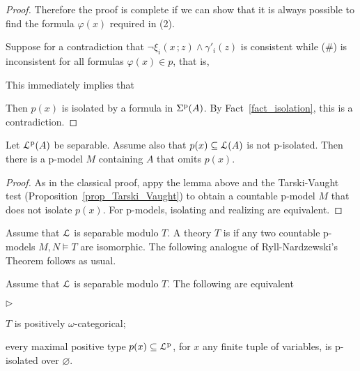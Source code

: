 \documentclass[10pt,oneside]{amsproc}
\newcommand{\mylabel}[1]{{#1}\hfill}
\renewenvironment{itemize}
  {\begin{list}{$\triangleright$}{%
  \setlength{\parskip}{0mm}
  \setlength{\topsep}{.4\baselineskip}
  \setlength{\rightmargin}{0mm}
  \setlength{\listparindent}{0mm}
  \setlength{\itemindent}{0mm}
  \setlength{\labelwidth}{3ex}
  \setlength{\itemsep}{.2\baselineskip}
  \setlength{\parsep}{.2\baselineskip}
  \setlength{\partopsep}{0mm}
  \setlength{\labelsep}{1ex}
  \setlength{\leftmargin}{\labelwidth+\labelsep}
  \let\makelabel\mylabel}}{%
\end{list}}
\renewcommand*{\emph}[1]{%
   \smash{\tikz[baseline]\node[rectangle, fill=teal!25, rounded corners, inner xsep=0.5ex, inner ysep=0.2ex, anchor=base, minimum height = 2.7ex]{\strut #1};}}
\begin{document}
{\begin{proof}
  Therefore the proof is complete if we can show that it is always possible to find the formula $\varphi(x)$ required in (2).
  
  Suppose for a contradiction that $\neg\xi_i(x\,;z)\wedge\gamma'_i(z)$ is consistent while (\#) is inconsistent for all formulas $\varphi(x)\in p$, that is, 
  
  
  This immediately implies that 
  
  
  Then $p(x)$ is isolated by a formula in $\Sigma^{\rm p}(A)$.
  By Fact~\ref{fact_isolation}, this is a contradiction.
  \end{proof}
  

\begin{theorem}\label{prop_OTT}
  Let ${\EuScript L}^{\rm p}(A)$ be separable.
  Assume also that $p(x)\subseteq{\EuScript L}(A)$ is not p-isolated.
  Then there is a p-model $M$ containing $A$ that omits $p(x)$. 
\end{theorem}

\begin{proof}
  As in the classical proof, appy the lemma above and the Tarski-Vaught test (Proposition~\ref{prop_Tarski_Vaught}) to obtain a countable p-model $M$ that does not isolate $p(x)$.
  For p-models, isolating and realizing are equivalent.
\end{proof}

Assume that ${\EuScript L}$ is separable modulo $T$.
A theory $T$ is \emph{positively $\omega$-categorical\/} if any two countable p-models $M,N\models T$ are isomorphic.
The following analogue of Ryll-Nardzewski's Theorem follows as usual.

\begin{theorem}
  Assume that ${\EuScript L}$ is separable modulo $T$.
  The following are equivalent
  \begin{itemize}
    \item[1.] $T$ is positively $\omega$-categorical;
    \item[2.] every maximal positive type $p(x)\subseteq{\EuScript L}^{\rm p}$, for $x$ any finite tuple of variables, is p-isolated over $\varnothing$.
  \end{itemize}
\end{theorem}

}
\end{document}
